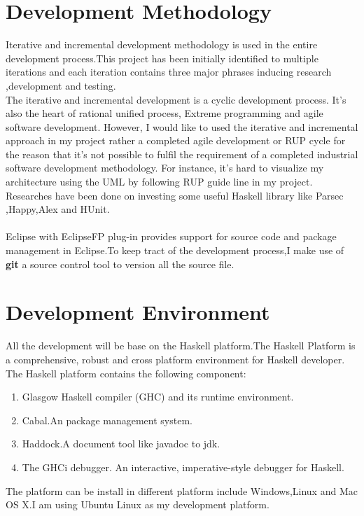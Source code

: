 \section{Development Methodology}
Iterative and incremental development methodology is used in the entire development process.This project has been initially identified to multiple iterations and each iteration contains three major phrases inducing research ,development and testing.\\

The iterative and incremental development is a cyclic development process.
It’s also the heart of rational unified process, Extreme programming and
agile software development. However, I would like to used the iterative and
incremental approach in my project rather a completed agile development or
RUP cycle for the reason that it’s not possible to fulfil the requirement of a
completed industrial software development methodology. For instance, it’s
hard to visualize my architecture using the UML by following RUP guide
line in my project.\\


Researches have been done on investing some useful Haskell library like Parsec ,Happy,Alex and HUnit.
\\
\\
Eclipse with EclipseFP plug-in provides support for source code and package management in Eclipse.To keep tract of the development process,I make use of \textbf{git} a source control tool to version all the source file.

\section{Development Environment}
All the development  will be base on the Haskell platform.The Haskell Platform is a comprehensive, robust and cross platform  environment for Haskell developer.
The Haskell platform contains the following component:
\begin{enumerate}
\item Glasgow Haskell compiler (GHC) and its runtime environment.
\item Cabal.An package management system.
\item Haddock.A document tool like javadoc to jdk.
\item The GHCi debugger.
An interactive, imperative-style debugger for Haskell.
\end{enumerate}
The platform can be install in different platform include Windows,Linux and Mac OS X.I am using Ubuntu Linux as my development platform.


